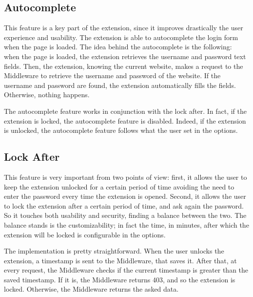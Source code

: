 \subsection{Autocomplete}

This feature is a key part of the extension, since it improves drastically the user experience and usability. The extension is able to autocomplete the login form when the page is loaded. 
The idea behind the autocomplete is the following: when the page is loaded, the extension retrieves the username and password text fields. Then, the extension, knowing the current website, makes a request to the Middleware to retrieve the username and password of the website. If the username and password are found, the extension automatically fills the fields. Otherwise, nothing happens.

The autocomplete feature works in conjunction with the lock after. In fact, if the extension is locked, the autocomplete feature is disabled. Indeed, if the extension is unlocked, the autocomplete feature follows what the user set in the options.
\subsection{Lock After}

This feature is very important from two points of view: first, it allows the user to keep the extension unlocked for a certain period of time avoiding the need to enter the password every time the extension is opened. Second, it allows the user to lock the extension after a certain period of time, and ask again the password. So it touches both usability and security, finding a balance between the two. The balance stands is the customizability; in fact the time, in minutes, after which the extension will be locked is configurable in the options. 

The implementation is pretty straightforward. When the user unlocks the extension, a timestamp is sent to the Middleware, that saves it. After that, at every request, the Middleware checks if the current timestamp is greater than the saved timestamp. If it is, the Middleware returns 403, and so the extension is locked. Otherwise, the Middleware returns the asked data. 
